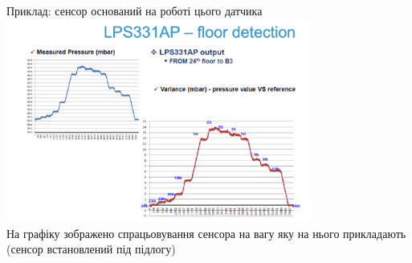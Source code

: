 \documentclass{beamer}
\begin{document}
  
   \begin{frame}{Приклад: сенсор оснований на роботі цього датчика}
 \includegraphics[width=10cm]{davl3.png}\\ 

  {\small{На графіку зображено спрацьовування  сенсора на  вагу яку на нього прикладають
(сенсор встановлений під підлогу)  }}
\end{frame}


  
  
  
  
  
  
  
\end{document}
